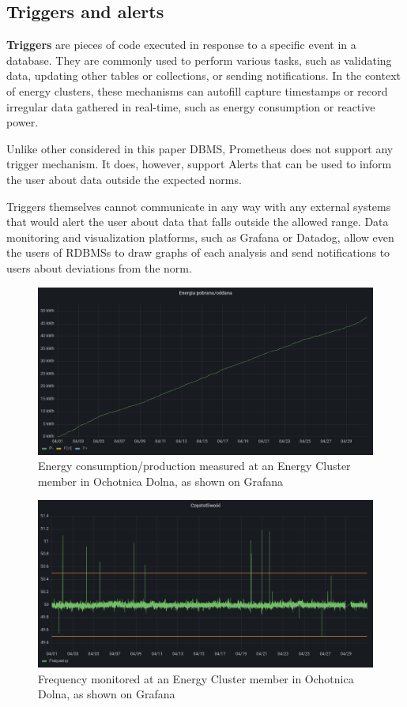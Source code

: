 \subsection{Triggers and alerts}
\par \textbf{Triggers} are pieces of code executed in response to a specific event in a database. They are commonly used to perform various tasks, such as validating data, updating other tables or collections, or sending notifications. In the context of energy clusters, these mechanisms can autofill capture timestamps or record irregular data gathered in real-time, such as energy consumption or reactive power.
\par Unlike other considered in this paper DBMS, Prometheus does not support any trigger mechanism. It does, however, support Alerts that can be used to inform the user about data outside the expected norms.
\par Triggers themselves cannot communicate in any way with any external systems that would alert the user about data that falls outside the allowed range. Data monitoring and visualization platforms, such as Grafana or Datadog, allow even the users of RDBMSs to draw graphs of each analysis and send notifications to users about deviations from the norm.
\begin{figure}[htbp]
 \centering
 \includegraphics[width=1\textwidth]{gfx/ochotnica-dolna-atende-energy-consumed-produced}
 \caption{Energy consumption/production measured at an Energy Cluster member in Ochotnica Dolna, as shown on Grafana}
\end{figure}
\begin{figure}[htbp]
 \centering
 \includegraphics[width=1\textwidth]{gfx/ochotnica-dolna-atende-frequency}
 \caption{Frequency monitored at an Energy Cluster member in Ochotnica Dolna, as shown on Grafana}
\end{figure}

